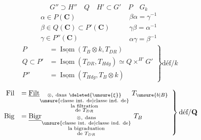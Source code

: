 \[
G''\supset H''\quad Q\quad H'\subset G'\quad P\quad G_k
\]
\[
\boxed{\begin{array}{l}
\alpha\in P(\mathbf C)\\
\beta\in Q(\mathbf C)\subset P'(\mathbf C)\\
\gamma\in P''(\mathbf C)
\end{array}}
\qquad
\begin{array}{l}
\beta\alpha=\gamma^{-1}\\
\gamma\beta=\alpha^{-1}\\
\alpha\gamma=\beta^{-1}
\end{array}
\]
\[
\left.\begin{array}{rl}
P&=\underline{\operatorname{Isom}}(T_B\otimes k,T_{DR})\\
Q\subset P'&=\underline{\operatorname{Isom}}(T_{DR},T_{Hdg})\simeq Q\mathbin{\times^{H'}}G'\\
P''&=\underline{\operatorname{Isom}}(T_{Hdg},T_B\otimes k)
\end{array}\right\}\text{déf}/k
\]

\[
\left.\begin{array}{rl}
\mathrm{Fil}&=\underline{\operatorname{Filt}}_{\substack{\otimes,\ \text{dans}\ \deleted{\unsure{\xi}}\\\unsure{\text{classe int. de}|\text{classe ind. de}}\\\text{la filtration}\\\text{de }T_{DR}}}\ T_{\unsure{b|B}}\\[2em]
\mathrm{Big}&=\underline{\operatorname{Bigr}}_{\substack{\otimes,\ \text{dans}\\\unsure{\text{classe int. de}|\text{classe ind. de}}\\\text{la bigraduation}\\\text{de }T_{DR}}}\ T_B
\end{array}\right\}\text{déf}/\mathbf Q
\]


